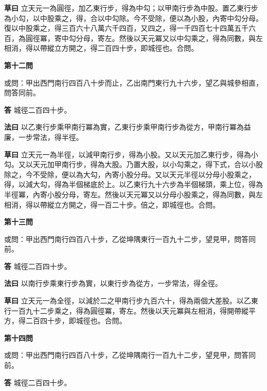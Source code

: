 \documentclass[11pt,a4paper]{article}
\newcommand{\problem}[1]{\par\noindent\textbf{\color{problemcolor}#1}\par\nopagebreak}
\newcommand{\answer}[1]{\par\noindent\textbf{答} #1\par}
\newcommand{\method}[1]{\par\noindent\textbf{法曰} #1\par}
\newcommand{\workings}[1]{\par\noindent\textbf{草曰} #1\par}
\begin{document}
\workings{立天元一為圓徑，加乙東行步，得為中勾；以甲南行步為中股。置乙東行步為小勾，以中股乘之，得，合以中勾除。今不受除，便以為小股，內寄中勾分母。復以中股乘之，得三百六十八萬六千四百，又四之，得一千四百七十四萬五千六百，為圓徑冪，寄中勾分母，寄左。然後以天元冪又以中勾乘之，得為同數，與左相消，得以帶縱立方開之，得二百四十步，即城徑也。合問。}

\vspace{0.5cm}

\problem{第十二問}

\noindent 或問：甲出西門南行四百八十步而止，乙出南門東行九十六步，望乙與城參相直，問答同前。

\answer{城徑二百四十步。}

\method{以乙東行步乘甲南行冪為實，乙東行步乘甲南行步為從方，甲南行冪為益廉，一步常法，得半徑。}

\workings{立天元一為半徑，以減甲南行步，得為小股。又以天元加乙東行步，得為小勾。又以天元加甲南行步，得為大股。乃置大股，以小勾乘之，得下式，合以小股除之，今不受除，便以為大勾，內寄小股分母。又以天元半徑以分母小股乘之，得，以減大勾，得為半個梯底於上。以乙東行九十六步為半個梯頭，乘上位，得為半徑冪，內寄小股分母，寄左。然後以天元冪又以分母小股乘之，得為同數，與左相消，得以帶縱立方開之，得一百二十步。倍之，即城徑也。合問。}

\vspace{0.5cm}

\problem{第十三問}

\noindent 或問：甲出西門南行四百八十步，乙從坤隅東行一百九十二步，望見甲，問答同前。

\answer{城徑二百四十步。}

\method{以南行步乘東行步為實，以東行步為從方，一步常法，得全徑。}

\workings{立天元一為全徑，以減於二之甲南行步九百六十，得為兩個大差股。以乙東行一百九十二步乘之，得為圓徑冪，寄左。然後以天元冪與左相消，得開帶縱平方，得二百四十步，即城徑也。合問。}

\vspace{0.5cm}

\problem{第十四問}

\noindent 或問：甲出西門南行四百八十步，乙從坤隅南行一百九十二步，望見甲，問答同前。

\answer{城徑二百四十步。}
\end{document}
